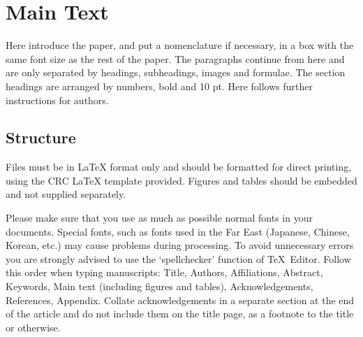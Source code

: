 \documentclass[3p,times,procedia,twocolumn,twoside]{elsarticle}
\begin{document}





\enlargethispage{-13mm}
\section{Main Text}
\label{main}

Here introduce the paper, and put a nomenclature if necessary, in a
box with the same font size as the rest of the paper. The
paragraphs continue from here and are only separated by headings,
subheadings, images and formulae. The section headings are
arranged by numbers, bold and 10 pt. Here follows further
instructions for authors.

\begin{nomenclature}
\begin{deflist}[A]
   
\end{deflist}
\end{nomenclature}
\vspace*{2pt}

\subsection{ Structure}
Files must be in LaTeX format only and should be formatted for direct
printing, using the CRC LaTeX template provided.  Figures and tables
should be embedded and not supplied separately.

Please make sure that you use as much as possible normal fonts in your
documents. Special fonts, such as fonts used in the Far East
(Japanese, Chinese, Korean, etc.) may cause problems during
processing. To avoid unnecessary errors you are strongly advised to
use the `spellchecker' function of TeX~Editor.  Follow this order when
typing manuscripts: Title, Authors, Affiliations, Abstract, Keywords,
Main text (including figures and tables), Acknowledgements,
References, Appendix.  Collate acknowledgements in a separate section
at the end of the article and do not include them on the title page,
as a footnote to the title or otherwise.
\end{document}

